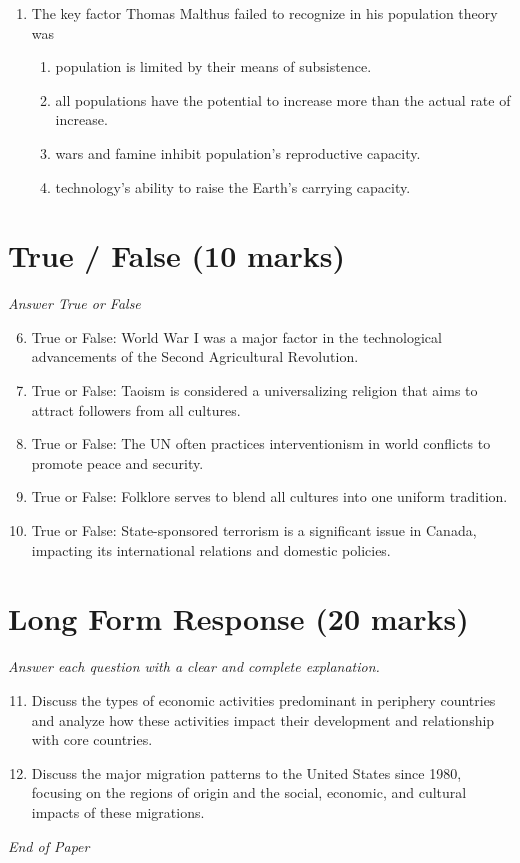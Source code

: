 \documentclass[12pt]{article}
\begin{document}
\begin{enumerate}[label=\arabic*.]
\begin{enumerate}[label=(\alph*)]
    \item locational interdependence.
\end{enumerate}
\item The key factor Thomas Malthus failed to recognize in his population theory was
\begin{enumerate}[label=(\alph*)]
    \item population is limited by their means of subsistence.
    \item all populations have the potential to increase more than the actual rate of increase.
    \item wars and famine inhibit population's reproductive capacity.
    \item technology's ability to raise the Earth's carrying capacity.
\end{enumerate}
\end{enumerate}

\section*{True / False (10 marks)}
\textit{Answer True or False}
\begin{enumerate}[label=\arabic*.]
\setcounter{enumi}{5}
\item True or False: World War I was a major factor in the technological advancements of the Second Agricultural Revolution.
\item True or False: Taoism is considered a universalizing religion that aims to attract followers from all cultures.
\item True or False: The UN often practices interventionism in world conflicts to promote peace and security.
\item True or False: Folklore serves to blend all cultures into one uniform tradition.
\item True or False: State-sponsored terrorism is a significant issue in Canada, impacting its international relations and domestic policies.
\end{enumerate}

\section*{Long Form Response (20 marks)}
\textit{Answer each question with a clear and complete explanation.}
\begin{enumerate}[label=\arabic*.]
\setcounter{enumi}{10}
\item Discuss the types of economic activities predominant in periphery countries and analyze how these activities impact their development and relationship with core countries.
\item Discuss the major migration patterns to the United States since 1980, focusing on the regions of origin and the social, economic, and cultural impacts of these migrations.
\end{enumerate}

\vfill
\noindent\textit{End of Paper}
\end{document}
